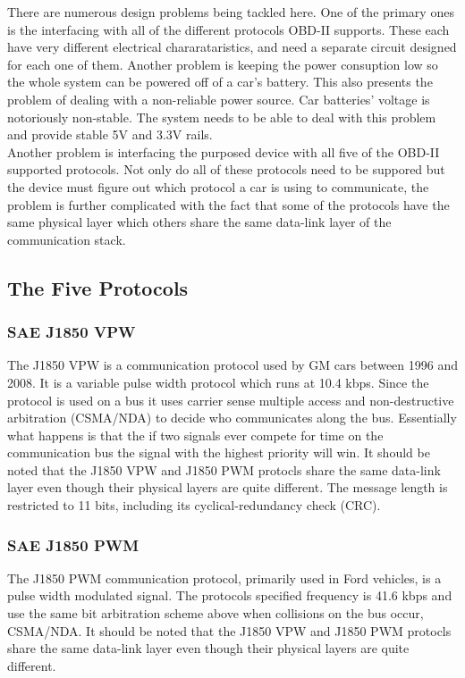 \documentclass[12pt,letterpaper]{article}
\begin{document}
There are numerous design problems being tackled here. One of the primary ones is the interfacing with all of the different protocols OBD-II supports. These each have very different electrical chararataristics, and need a separate circuit designed for each one of them. Another problem is keeping the power consuption low so the whole system can be powered off of a car's battery. This also presents the problem of dealing with a non-reliable power source. Car batteries' voltage is notoriously non-stable. The system needs to be able to deal with this problem and provide stable 5V and 3.3V rails. \\

Another problem is interfacing the purposed device with all five of the OBD-II supported protocols. Not only do all of these protocols need to be suppored but the device must figure out which protocol a car is using to communicate, the problem is further complicated with the fact that some of the protocols have the same physical layer which others share the same data-link layer of the communication stack. 

\subsection{The Five Protocols}
\subsubsection{SAE J1850 VPW}
The J1850 VPW is a communication protocol used by GM cars between 1996 and 2008. It is a variable pulse width protocol which runs at 10.4 kbps. Since the protocol is used on a bus it uses carrier sense multiple access and non-destructive arbitration (CSMA/NDA) to decide who communicates along the bus. Essentially what happens is that the if two signals ever compete for time on the communication bus the signal with the highest priority will win. It should be noted that the J1850 VPW and J1850 PWM protocls share the same data-link layer even though their physical layers are quite different. The message length is restricted to 11 bits, including its cyclical-redundancy check (CRC).
 
\subsubsection{SAE J1850 PWM}
The J1850 PWM communication protocol, primarily used in Ford vehicles, is a pulse width modulated signal. The protocols specified frequency is 41.6 kbps and use the same bit arbitration scheme above when collisions on the bus occur, CSMA/NDA. It should be noted that the J1850 VPW and J1850 PWM protocls share the same data-link layer even though their physical layers are quite different.
\end{document}
